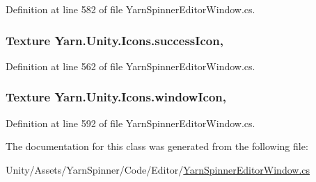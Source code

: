Definition at line 582 of file Yarn\-Spinner\-Editor\-Window.\-cs.

\hypertarget{a00105_aec8aea03eb6e31771ebc98e0611fff79}{
\subsubsection[{success\-Icon}]{\setlength{\rightskip}{0pt plus 5cm}Texture Yarn.\-Unity.\-Icons.\-success\-Icon\hspace{0.3cm}{\ttfamily [static]}, {\ttfamily [get]}}}\label{a00105_aec8aea03eb6e31771ebc98e0611fff79}


Definition at line 562 of file Yarn\-Spinner\-Editor\-Window.\-cs.

\hypertarget{a00105_aa78ab016ad041bc36850c8b20ba63972}{
\subsubsection[{window\-Icon}]{\setlength{\rightskip}{0pt plus 5cm}Texture Yarn.\-Unity.\-Icons.\-window\-Icon\hspace{0.3cm}{\ttfamily [static]}, {\ttfamily [get]}}}\label{a00105_aa78ab016ad041bc36850c8b20ba63972}


Definition at line 592 of file Yarn\-Spinner\-Editor\-Window.\-cs.



The documentation for this class was generated from the following file\-:\begin{DoxyCompactItemize}
\item 
Unity/\-Assets/\-Yarn\-Spinner/\-Code/\-Editor/\hyperlink{a00284}{Yarn\-Spinner\-Editor\-Window.\-cs}\end{DoxyCompactItemize}
